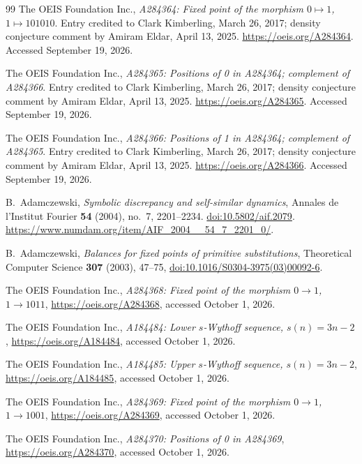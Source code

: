 \documentclass[11pt]{article}
\numberwithin{equation}{section}
\theoremstyle{definition}
\theoremstyle{remark}
\begin{document}
\clearpage
{}
{}
\begin{thebibliography}{99}
The OEIS Foundation Inc., \emph{A284364: Fixed point of the morphism
$0\mapsto1$, $1\mapsto101010$}. Entry credited to Clark Kimberling,
March 26, 2017; density conjecture comment by Amiram Eldar, April 13, 2025.
\url{https://oeis.org/A284364}. Accessed September 19, 2026.

The OEIS Foundation Inc., \emph{A284365: Positions of 0 in A284364;
complement of A284366}. Entry credited to Clark Kimberling,
March 26, 2017; density conjecture comment by Amiram Eldar, April 13, 2025.
\url{https://oeis.org/A284365}. Accessed September 19, 2026.

The OEIS Foundation Inc., \emph{A284366: Positions of 1 in A284364;
complement of A284365}. Entry credited to Clark Kimberling,
March 26, 2017; density conjecture comment by Amiram Eldar, April 13, 2025.
\url{https://oeis.org/A284366}. Accessed September 19, 2026.

B.~Adamczewski, \emph{Symbolic discrepancy and self-similar dynamics},
Annales de l'Institut Fourier \textbf{54} (2004), no.~7, 2201--2234.
\href{https://doi.org/10.5802/aif.2079}{doi:10.5802/aif.2079}.
\url{https://www.numdam.org/item/AIF_2004__54_7_2201_0/}.

B.~Adamczewski,
\emph{Balances for fixed points of primitive substitutions},
Theoretical Computer Science \textbf{307} (2003), 47--75,
\href{https://doi.org/10.1016/S0304-3975(03)00092-6}
{doi:10.1016/S0304-3975(03)00092-6}.

The OEIS Foundation Inc.,
\emph{A284368: Fixed point of the morphism $0\to1$, $1\to1011$},
\url{https://oeis.org/A284368}, accessed October 1, 2026.

The OEIS Foundation Inc.,
\emph{A184484: Lower $s$-Wythoff sequence, $s(n)=3n-2$},
\url{https://oeis.org/A184484}, accessed October 1, 2026.

The OEIS Foundation Inc.,
\emph{A184485: Upper $s$-Wythoff sequence, $s(n)=3n-2$},
\url{https://oeis.org/A184485}, accessed October 1, 2026.

The OEIS Foundation Inc.,
\emph{A284369: Fixed point of the morphism $0\to1$, $1\to1001$},
\url{https://oeis.org/A284369}, accessed October 1, 2026.

The OEIS Foundation Inc.,
\emph{A284370: Positions of 0 in A284369},
\url{https://oeis.org/A284370}, accessed October 1, 2026.


\end{thebibliography}
\end{document}
